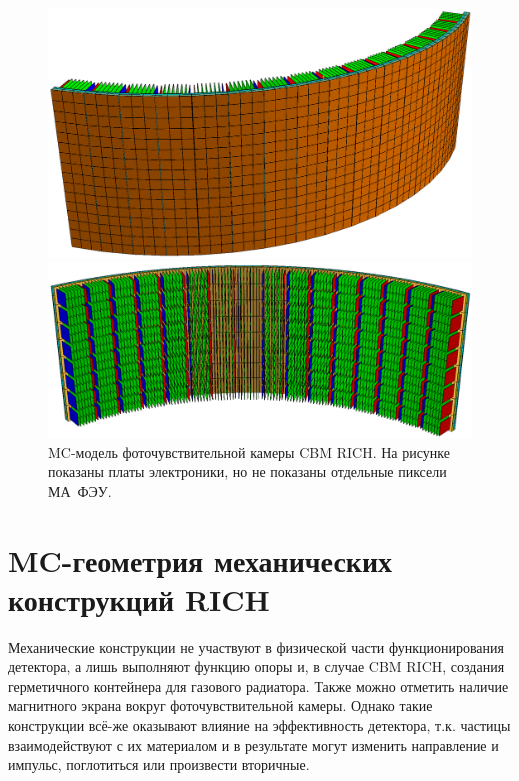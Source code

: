 \begin{figure}[H]
\begin{minipage}[b]{0.495\textwidth}
\includegraphics[width=1.0\textwidth]{pictures/Camera_pmts.png}
\end{minipage}
\hspace{0.01\textwidth}
\begin{minipage}[b]{0.495\textwidth}
\includegraphics[width=1.0\textwidth]{pictures/Camera_back.png}
\end{minipage}
\caption{MC-модель фоточувствительной камеры CBM RICH. На рисунке показаны платы электроники, но не показаны отдельные пиксели МА~ФЭУ.}
\label{fig:geoMCcamera}
\end{figure}

\section{MC-геометрия механических конструкций RICH}\label{RICHgeoMech}

Механические конструкции не участвуют в физической части функционирования детектора, а лишь выполняют функцию опоры и, в случае CBM RICH, создания герметичного контейнера для газового радиатора. Также можно отметить наличие магнитного экрана вокруг фоточувствительной камеры. Однако такие конструкции всё-же оказывают влияние на эффективность детектора, т.к. частицы взаимодействуют с их материалом и в результате могут изменить направление и импульс, поглотиться или произвести вторичные.

